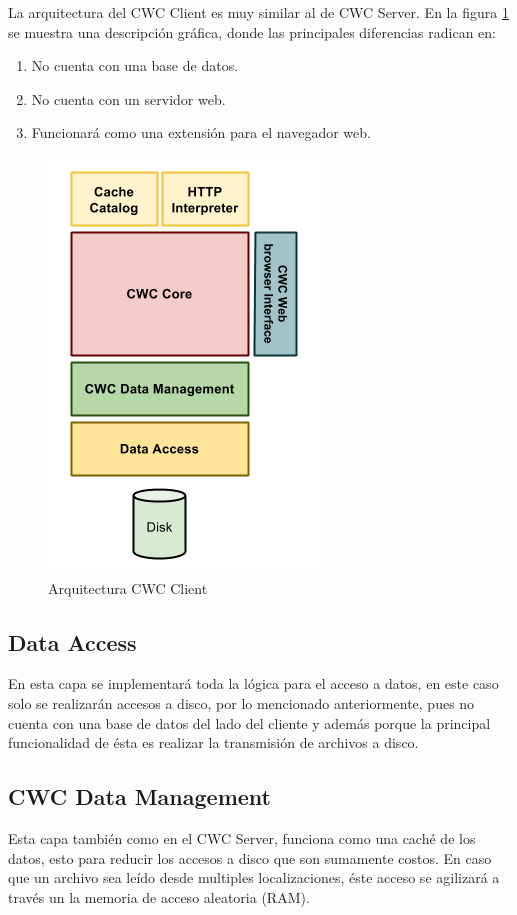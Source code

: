 La arquitectura del CWC Client es muy similar al de CWC Server. En la figura \ref{ArquitecturaCWCClient} se muestra una descripción gráfica, donde las principales diferencias radican en:

\begin{enumerate}
\item No cuenta con una base de datos.
\item No cuenta con un servidor web. 
\item Funcionará como una extensión para el navegador web. 
\end{enumerate}

\begin{figure}
  \centering
    \includegraphics[scale=0.75]{gfx/ArquitecturaCWCClient}
  \caption{Arquitectura CWC Client}
  \label{ArquitecturaCWCClient}
\end{figure}

\subsection{Data Access}
En esta capa se implementará toda la lógica para el acceso a datos, en este caso solo se realizarán accesos a disco, por lo mencionado anteriormente, pues no cuenta con una base de datos del lado del cliente y además porque la principal funcionalidad de ésta es realizar la transmisión de archivos a disco. 

\subsection{CWC Data Management}
Esta capa también como en el CWC Server, funciona como una caché de los datos, esto para reducir los accesos a disco que son sumamente costos.
En caso que un archivo sea leído desde multiples localizaciones, éste acceso se agilizará a través un la memoria de acceso aleatoria (RAM).

